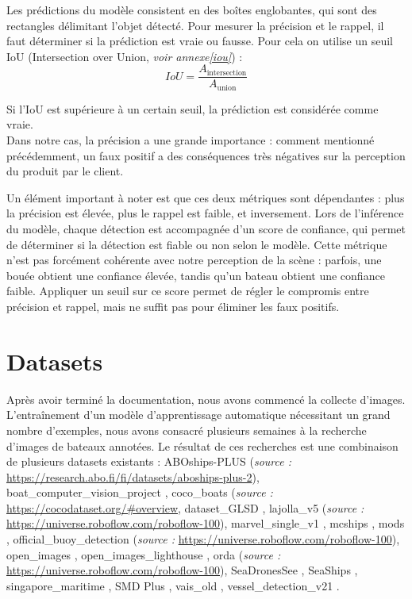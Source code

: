 Les prédictions du modèle consistent en des boîtes englobantes, qui sont des rectangles délimitant
l'objet détecté. Pour mesurer la précision et le rappel, il faut déterminer si la prédiction
est vraie ou fausse. Pour cela on utilise un seuil IoU (Intersection over Union,
\textit{voir annexe\ref{iou}}) :
\[
    IoU = \frac{A_{\text{intersection}}}{A_{\text{union}}}
\]

Si l'IoU est supérieure à un certain seuil, la prédiction est considérée comme vraie.\\

Dans notre cas, la précision a une grande importance : comment mentionné précédemment,
un faux positif a des conséquences très négatives sur la perception du produit par le client.

Un élément important à noter est que ces deux métriques sont dépendantes : plus la précision est élevée,
plus le rappel est faible, et inversement. Lors de l'inférence du modèle, chaque détection est accompagnée
d'un score de confiance, qui permet de déterminer si la détection est fiable ou non
selon le modèle. Cette métrique n'est pas forcément cohérente avec notre perception 
de la scène : parfois, une bouée obtient une confiance élevée, tandis qu'un bateau
obtient une confiance faible. Appliquer un seuil
sur ce score permet de régler le compromis entre précision et rappel, 
mais ne suffit pas pour éliminer les faux positifs.\\

\section{Datasets}

Après avoir terminé la documentation, nous avons commencé la collecte d'images.
L'entraînement d'un modèle d'apprentissage automatique nécessitant un grand nombre d'exemples,
nous avons consacré plusieurs semaines à la recherche d'images de bateaux annotées.
Le résultat de ces recherches est une combinaison de plusieurs datasets existants :
ABOships-PLUS (\textit{source : }\url{https://research.abo.fi/fi/datasets/aboships-plus-2}), 
boat\_computer\_vision\_project \cite{boat-detection-4tmst_dataset}, 
coco\_boats (\textit{source : }\url{https://cocodataset.org/#overview}, 
dataset\_GLSD \cite{Shao_Wang_Deng_Huang_Lu_Luo_Zhang_Lv_Dang_Ding_etal_2021}, 
lajolla\_v5 (\textit{source : }\url{https://universe.roboflow.com/roboflow-100}),
marvel\_single\_v1 \cite{MARVEL},
mcships \cite{Mcships2020},
mods \cite{Bovcon_Muhovic_Vranac_Mozetic_Pers_Kristan_2021},
official\_buoy\_detection (\textit{source : }\url{https://universe.roboflow.com/roboflow-100}),
open\_images \cite{OpenImages2}, 
open\_images\_lighthouse \cite{OpenImages2},
orda (\textit{source : }\url{https://universe.roboflow.com/roboflow-100}), 
SeaDronesSee \cite{varga2022seadronessee}, 
SeaShips \cite{shao2018seaships},
singapore\_maritime \cite{Prasad_Rajan_Rachmawati_Rajabaly_Quek_2016}, 
SMD Plus \cite{smd_plus}, 
vais\_old \cite{vais_old}, 
vessel\_detection\_v21 \cite{Matasci_Plante_Kasa_Mousavi_Stewart_Macdonald_Webster_Busler_2021}.


